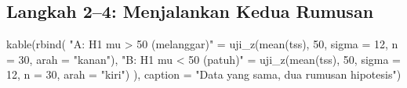 \documentclass[
  indonesian,
  letterpaper,
]{book}
\newenvironment{Shaded}{\begin{snugshade}}{\end{snugshade}}
\newcommand{\AttributeTok}[1]{\textcolor[rgb]{0.40,0.45,0.13}{#1}}
\newcommand{\DecValTok}[1]{\textcolor[rgb]{0.68,0.00,0.00}{#1}}
\newcommand{\FunctionTok}[1]{\textcolor[rgb]{0.28,0.35,0.67}{#1}}
\newcommand{\NormalTok}[1]{\textcolor[rgb]{0.00,0.23,0.31}{#1}}
\newcommand{\OtherTok}[1]{\textcolor[rgb]{0.00,0.23,0.31}{#1}}
\newcommand{\StringTok}[1]{\textcolor[rgb]{0.13,0.47,0.30}{#1}}
\begin{document}
\subsection{Langkah 2--4: Menjalankan Kedua
Rumusan}\label{langkah-24-menjalankan-kedua-rumusan}

\begin{Shaded}
\begin{Highlighting}[]
\FunctionTok{kable}\NormalTok{(}\FunctionTok{rbind}\NormalTok{(}
  \StringTok{"A: H1 mu \textgreater{} 50 (melanggar)"} \OtherTok{=} \FunctionTok{uji\_z}\NormalTok{(}\FunctionTok{mean}\NormalTok{(tss), }\DecValTok{50}\NormalTok{, }\AttributeTok{sigma =} \DecValTok{12}\NormalTok{, }\AttributeTok{n =} \DecValTok{30}\NormalTok{, }\AttributeTok{arah =} \StringTok{"kanan"}\NormalTok{),}
  \StringTok{"B: H1 mu \textless{} 50 (patuh)"}     \OtherTok{=} \FunctionTok{uji\_z}\NormalTok{(}\FunctionTok{mean}\NormalTok{(tss), }\DecValTok{50}\NormalTok{, }\AttributeTok{sigma =} \DecValTok{12}\NormalTok{, }\AttributeTok{n =} \DecValTok{30}\NormalTok{, }\AttributeTok{arah =} \StringTok{"kiri"}\NormalTok{)}
\NormalTok{), }\AttributeTok{caption =} \StringTok{"Data yang sama, dua rumusan hipotesis"}\NormalTok{)}
\end{Highlighting}
\end{Shaded}
\end{document}

